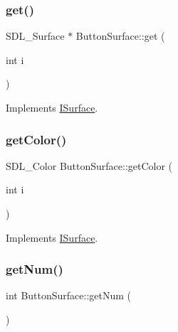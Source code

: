 \subsubsection{\texorpdfstring{get()}{get()}}
{\footnotesize\ttfamily S\+D\+L\+\_\+\+Surface $\ast$ Button\+Surface\+::get (\begin{DoxyParamCaption}\item[{int}]{i }\end{DoxyParamCaption})\hspace{0.3cm}{\ttfamily [virtual]}}



Implements \mbox{\hyperlink{class_i_surface_a45bacb1ffa6f0835e3ece0123b90c4fc}{I\+Surface}}.

\mbox{\label{class_button_surface_a4ba118fccc0224e235efcb3b26f0d26c}} 
\subsubsection{\texorpdfstring{get\+Color()}{getColor()}}
{\footnotesize\ttfamily S\+D\+L\+\_\+\+Color Button\+Surface\+::get\+Color (\begin{DoxyParamCaption}\item[{int}]{i }\end{DoxyParamCaption})\hspace{0.3cm}{\ttfamily [virtual]}}



Implements \mbox{\hyperlink{class_i_surface_adf609edb8f871bf37ed9aaf8fe0d2695}{I\+Surface}}.

\mbox{\label{class_button_surface_a32a0a3c0d2a706d2aad7ac32d2c96ccd}} 
\subsubsection{\texorpdfstring{get\+Num()}{getNum()}}
{\footnotesize\ttfamily int Button\+Surface\+::get\+Num (\begin{DoxyParamCaption}{ }\end{DoxyParamCaption})\hspace{0.3cm}{\ttfamily [virtual]}}



